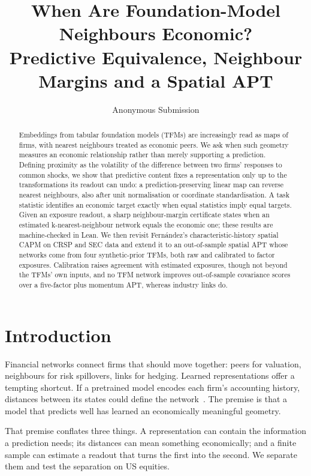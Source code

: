 \documentclass[letterpaper]{article} %
\title{When Are Foundation-Model Neighbours Economic?\\
Predictive Equivalence, Neighbour Margins and a Spatial APT}
\author{Anonymous Submission}
\theoremstyle{definition}
\begin{document}
\maketitle

\begin{abstract}
Embeddings from tabular foundation models (TFMs) are increasingly read as maps
of firms, with nearest neighbours treated as economic peers. We ask when such
geometry measures an economic relationship rather than merely supporting a
prediction. Defining proximity as the volatility of the difference between two
firms' responses to common shocks, we show that predictive content fixes a
representation only up to the transformations its readout can undo: a
prediction-preserving linear map can reverse nearest neighbours, also after
unit normalisation or coordinate standardisation. A task statistic identifies
an economic target exactly when equal statistics imply equal targets. Given an
exposure readout, a sharp neighbour-margin certificate states when an estimated
k-nearest-neighbour network equals the economic one; these results are
machine-checked in Lean. We then revisit Fern\'andez's characteristic-history
spatial CAPM on CRSP and SEC data and extend it to an out-of-sample spatial APT
whose networks come from four synthetic-prior TFMs, both raw and calibrated to
factor exposures. Calibration raises agreement with estimated exposures, though
not beyond the TFMs' own inputs, and no TFM network improves out-of-sample
covariance scores over a five-factor plus momentum APT, whereas industry links
do.
\end{abstract}

\section{Introduction}\label{sec:intro}
Financial networks connect firms that should move together: peers for
valuation, neighbours for risk spillovers, links for hedging. Learned
representations offer a tempting shortcut. If a pretrained model encodes each
firm's accounting history, distances between its states could define the
network~\citep{gabaix2025asset,hoberg2016}. The premise is that a model that
predicts well has learned an economically meaningful geometry.

That premise conflates three things. A representation can contain the
information a prediction needs; its distances can mean something economically;
and a finite sample can estimate a readout that turns the first into the
second. We separate them and test the separation on US equities.
\end{document}
